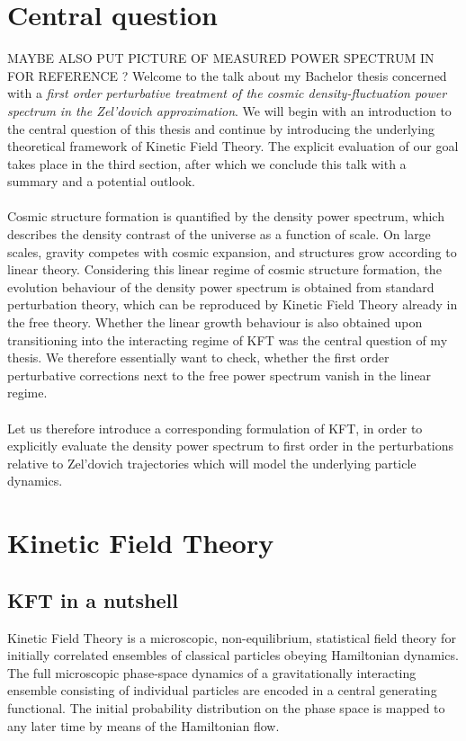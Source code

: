 

\section{Central question}
MAYBE ALSO PUT PICTURE OF MEASURED POWER SPECTRUM IN FOR REFERENCE ?
Welcome to the talk about my Bachelor thesis concerned with a \emph{first order perturbative treatment of the cosmic density-fluctuation power spectrum in the Zel'dovich approximation}.
We will begin with an introduction to the central question of this thesis and continue by introducing the underlying theoretical framework of Kinetic Field Theory.
The explicit evaluation of our goal takes place in the third section, after which we conclude this talk with a summary and a potential outlook.
\\
\\
Cosmic structure formation is quantified by the density power spectrum, which describes the density contrast of the universe as a function of scale. On large scales, gravity competes with cosmic expansion, and structures grow according to linear theory. Considering this linear regime of cosmic structure formation, the evolution behaviour of the density power spectrum is obtained from standard perturbation theory, which can be reproduced by Kinetic Field Theory already in the free theory.
Whether the linear growth behaviour is also obtained upon transitioning into the interacting regime of KFT was the central question of my thesis.
We therefore essentially want to check, whether the first order perturbative corrections next to the free power spectrum vanish in the linear regime.
\\
\\
Let us therefore introduce a corresponding formulation of KFT, in order to explicitly evaluate the density power spectrum to first order in the perturbations relative to Zel'dovich trajectories which will model the underlying particle dynamics.
\section{Kinetic Field Theory}
\subsection{KFT in a nutshell}
Kinetic Field Theory is a microscopic, non-equilibrium, statistical field theory for initially
correlated ensembles of classical particles obeying Hamiltonian dynamics.
The full microscopic phase-space dynamics of a gravitationally interacting ensemble consisting
of individual particles are encoded in a central generating functional.
The initial probability distribution on the phase space is mapped to any later
time by means of the Hamiltonian flow.
